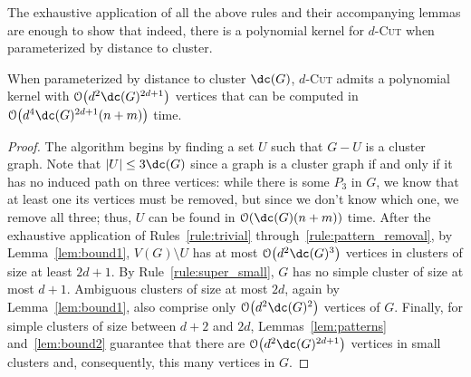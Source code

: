 \documentclass[a4paper,UKenglish,cleveref, autoref]{lipics-v2019}
\newcommand{\bigO}[1]{\mathcal{O}\!\left(#1\right)}
\newcommand{\pname}[1]{\textsc{#1}}
\begin{document}
The exhaustive application of all the above rules and their accompanying lemmas are enough to show that indeed, there is a polynomial kernel for \pname{$d$-Cut} when parameterized by distance to cluster.


\begin{theorem}
    When parameterized by distance to cluster $\dc(G)$, \pname{$d$-Cut} admits a polynomial kernel with $\bigO{d^2\dc(G)^{2d+1}}$ vertices that can be computed in $\bigO{d^4\dc(G)^{2d+1}(n+m)}$ time.
\end{theorem}

\begin{proof}
    The algorithm begins by finding a set $U$ such that $G - U$ is a cluster graph.
    Note that $|U| \leq 3\dc(G)$ since a graph is a cluster graph if and only if it has no induced path on three vertices: while there is some $P_3$ in $G$, we know that at least one its vertices must be removed, but since we don't know which one, we remove all three; thus, $U$ can be found in $\bigO{\dc(G)(n + m)}$ time.
    After the exhaustive application of Rules~\ref{rule:trivial} through~\ref{rule:pattern_removal}, by Lemma~\ref{lem:bound1}, $V(G) \setminus U$ has at most $\bigO{d^2\dc(G)^3}$ vertices in clusters of size at least $2d+1$.
    By Rule~\ref{rule:super_small}, $G$ has no simple cluster of size at most $d+1$.
    Ambiguous clusters of size at most $2d$, again by Lemma~\ref{lem:bound1}, also comprise only $\bigO{d^2\dc(G)^2}$ vertices of $G$.
    Finally, for simple clusters of size between $d+2$ and $2d$, Lemmas~\ref{lem:patterns} and~\ref{lem:bound2} guarantee that there are $\bigO{d^2\dc(G)^{2d+1}}$ vertices in small clusters and, consequently, this many vertices in $G$.


\end{proof}
\end{document}
